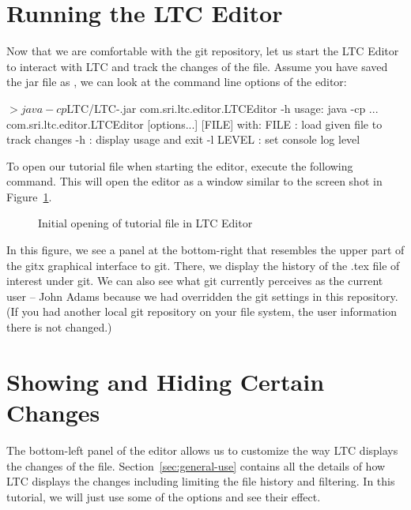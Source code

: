 \section{Running the LTC Editor}

Now that we are comfortable with the git repository, let us start the LTC Editor to interact with LTC and track the changes of the file.  Assume you have saved the jar file as , we can look at the command line options of the editor:
\begin{CodeVerbatim}[commandchars=\\\{\}]
$> java -cp $LTC/LTC-\version.jar com.sri.ltc.editor.LTCEditor -h
usage: java -cp ... com.sri.ltc.editor.LTCEditor [options...] [FILE] 
with:
 FILE     : load given file to track changes
 -h       : display usage and exit
 -l LEVEL : set console log level
\end{CodeVerbatim}

To open our tutorial file when starting the editor, execute the following command.  This will open the editor as a window similar to the screen shot in Figure~\ref{fig:editor-open}.
\begin{figure}[t]
\centering
{}
\caption{Initial opening of tutorial file in LTC Editor} \label{fig:editor-open}
\end{figure}
In this figure, we see a panel at the bottom-right that resembles the upper part of the gitx graphical interface to git.  There, we display the history of the .tex file of interest under git.  We can also see what git currently perceives as the current user -- John Adams because we had overridden the git settings in this repository.  (If you had another local git repository on your file system, the user information there is not changed.)

\section{Showing and Hiding Certain Changes}

The bottom-left panel of the editor allows us to customize the way LTC displays the changes of the file.  Section~\ref{sec:general-use} contains all the details of how LTC displays the changes including limiting the file history and filtering.  In this tutorial, we will just use some of the options and see their effect.

